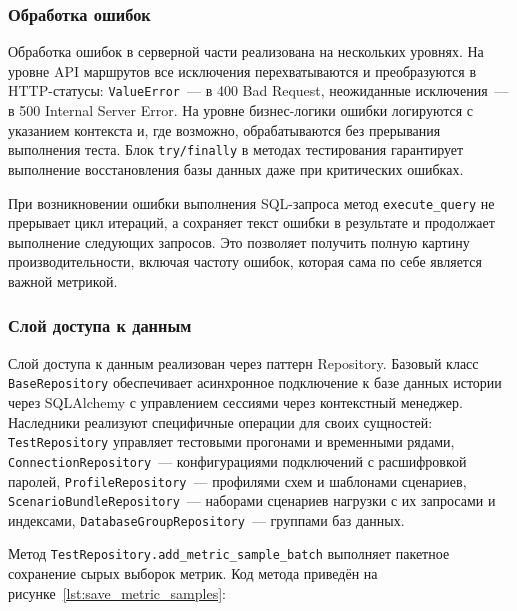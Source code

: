 \subsubsection{Обработка ошибок}

Обработка ошибок в серверной части реализована на нескольких уровнях. На уровне API маршрутов все исключения перехватываются и преобразуются в HTTP-статусы: \texttt{ValueError}~--- в 400 Bad Request, неожиданные исключения~--- в 500 Internal Server Error. На уровне бизнес-логики ошибки логируются с указанием контекста и, где возможно, обрабатываются без прерывания выполнения теста. Блок \texttt{try/finally} в методах тестирования гарантирует выполнение восстановления базы данных даже при критических ошибках.

При возникновении ошибки выполнения SQL-запроса метод \texttt{execute\_query} не прерывает цикл итераций, а сохраняет текст ошибки в результате и продолжает выполнение следующих запросов. Это позволяет получить полную картину производительности, включая частоту ошибок, которая сама по себе является важной метрикой.

\subsubsection{Слой доступа к данным}

Слой доступа к данным реализован через паттерн Repository. Базовый класс \texttt{BaseRepository} обеспечивает асинхронное подключение к базе данных истории через SQLAlchemy с управлением сессиями через контекстный менеджер. Наследники реализуют специфичные операции для своих сущностей: \texttt{TestRepository} управляет тестовыми прогонами и временными рядами, \texttt{ConnectionRepository}~--- конфигурациями подключений с расшифровкой паролей, \texttt{ProfileRepository}~--- профилями схем и шаблонами сценариев, \texttt{ScenarioBundleRepository}~--- наборами сценариев нагрузки с их запросами и индексами, \texttt{DatabaseGroupRepository}~--- группами баз данных.

Метод \texttt{TestRepository.add\_metric\_sample\_batch} выполняет пакетное сохранение сырых выборок метрик. Код метода приведён на рисунке~\ref{lst:save_metric_samples}:

